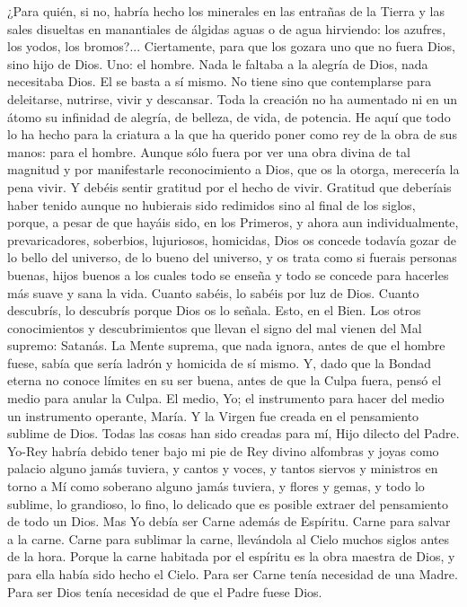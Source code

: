 \documentclass[12pt]{book} %
\begin{document}
¿Para quién, si no, habría hecho los minerales en las entrañas de la Tierra y las sales disueltas en manantiales de álgidas 
aguas o de agua hirviendo: los azufres, los yodos, los bromos?... Ciertamente, para que los gozara uno que no fuera Dios, sino hijo de Dios. Uno: el hombre. 
Nada le faltaba a la alegría de Dios, nada necesitaba Dios. El se basta a sí mismo. No tiene sino que contemplarse para 
deleitarse, nutrirse, vivir y descansar. Toda la creación no ha aumentado ni en un átomo su infinidad de alegría, de belleza, de vida, de potencia. He aquí que todo lo ha hecho para la criatura a la que ha querido poner como rey de la obra de sus manos: para el hombre. 
Aunque sólo fuera por ver una obra divina de tal magnitud y por manifestarle reconocimiento a Dios, que os la otorga, 
merecería la pena vivir. Y debéis sentir gratitud por el hecho de vivir. Gratitud que deberíais haber tenido aunque no hubierais sido redimidos sino al final de los siglos, porque, a pesar de que hayáis sido, en los Primeros, y ahora aun individualmente, prevaricadores, soberbios, lujuriosos, homicidas, Dios os concede todavía gozar de lo bello del universo, de lo bueno del universo, y os trata como si fuerais personas buenas, hijos buenos a los cuales todo se enseña y todo se concede para hacerles más suave y sana la vida. Cuanto sabéis, lo sabéis por luz de Dios. Cuanto descubrís, lo descubrís porque Dios os lo señala. Esto, en el Bien. Los otros conocimientos y descubrimientos que llevan el signo del mal vienen del Mal supremo: Satanás. 
La Mente suprema, que nada ignora, antes de que el hombre fuese, sabía que sería ladrón y homicida de sí mismo. Y, 
dado que la Bondad eterna no conoce límites en su ser buena, antes de que la Culpa fuera, pensó el medio para anular la Culpa. El medio, Yo; el instrumento para hacer del medio un instrumento operante, María. Y la Virgen fue creada en el pensamiento sublime de Dios. 
Todas las cosas han sido creadas para mí, Hijo dilecto del Padre. Yo-Rey habría debido tener bajo mi pie de Rey divino 
alfombras y joyas como palacio alguno jamás tuviera, y cantos y voces, y tantos siervos y ministros en torno a Mí como soberano alguno jamás tuviera, y flores y gemas, y todo lo sublime, lo grandioso, lo fino, lo delicado que es posible extraer del pensamiento de todo un Dios. Mas Yo debía ser Carne además de Espíritu. Carne para salvar a la carne. Carne para sublimar la carne, llevándola al Cielo muchos siglos antes de la hora. Porque la carne habitada por el espíritu es la obra maestra de Dios, y para ella había sido hecho el Cielo. Para ser Carne tenía necesidad de una Madre. Para ser Dios tenía necesidad de que el Padre fuese Dios. 
\end{document}

